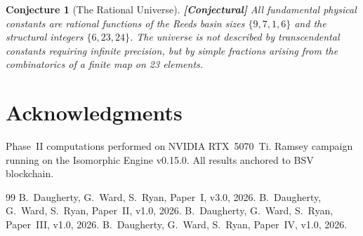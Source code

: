 \documentclass[12pt,a4paper]{article}
\newcommand{\conjectural}[1]{\textcolor{conjectural}{\textbf{[Conjectural]}} #1}
\newtheorem{conjecture}[theorem]{Conjecture}
\theoremstyle{definition}\newtheorem{definition}[theorem]{Definition}
\theoremstyle{remark}\newtheorem{remark}[theorem]{Remark}
\begin{document}
\begin{conjecture}[The Rational Universe]
\label{conj:rational}
\conjectural{All fundamental physical constants are rational functions of the
Reeds basin sizes $\{9, 7, 1, 6\}$ and the structural integers $\{6, 23, 24\}$.
The universe is not described by transcendental constants requiring infinite
precision, but by simple fractions arising from the combinatorics of a finite
map on 23 elements.}
\end{conjecture}

\section*{Acknowledgments}

Phase~II computations performed on NVIDIA RTX~5070~Ti. Ramsey campaign running
on the Isomorphic Engine v0.15.0. All results anchored to BSV blockchain.

\begin{thebibliography}{99}
 B.~Daugherty, G.~Ward, S.~Ryan, Paper~I, v3.0, 2026.
 B.~Daugherty, G.~Ward, S.~Ryan, Paper~II, v1.0, 2026.
 B.~Daugherty, G.~Ward, S.~Ryan, Paper~III, v1.0, 2026.
 B.~Daugherty, G.~Ward, S.~Ryan, Paper~IV, v1.0, 2026.
\end{thebibliography}
\end{document}
